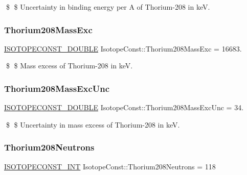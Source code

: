\$ \$ Uncertainty in binding energy per A of Thorium-\/208 in keV. \mbox{\label{group___isotope_const-_thorium-_th208_ga0853621c781ab985b66c22c74da66a8d}} 
\subsubsection{\texorpdfstring{Thorium208\+Mass\+Exc}{Thorium208MassExc}}
{\footnotesize\ttfamily \mbox{\hyperlink{group___isotope_const-_macros_ga8f45a7272ce02c0b4c65c44636ed719a}{I\+S\+O\+T\+O\+P\+E\+C\+O\+N\+S\+T\+\_\+\+D\+O\+U\+B\+LE}} Isotope\+Const\+::\+Thorium208\+Mass\+Exc = 16683.}

\$ \$ Mass excess of Thorium-\/208 in keV. \mbox{\label{group___isotope_const-_thorium-_th208_ga9d87941c94905c49cb9137367022edf7}} 
\subsubsection{\texorpdfstring{Thorium208\+Mass\+Exc\+Unc}{Thorium208MassExcUnc}}
{\footnotesize\ttfamily \mbox{\hyperlink{group___isotope_const-_macros_ga8f45a7272ce02c0b4c65c44636ed719a}{I\+S\+O\+T\+O\+P\+E\+C\+O\+N\+S\+T\+\_\+\+D\+O\+U\+B\+LE}} Isotope\+Const\+::\+Thorium208\+Mass\+Exc\+Unc = 34.}

\$ \$ Uncertainty in mass excess of Thorium-\/208 in keV. \mbox{\label{group___isotope_const-_thorium-_th208_ga2286a39d80cb58a1c0c2f5920de6ac18}} 
\subsubsection{\texorpdfstring{Thorium208\+Neutrons}{Thorium208Neutrons}}
{\footnotesize\ttfamily \mbox{\hyperlink{group___isotope_const-_macros_ga5f18360b3e99483a35c32d789e62621c}{I\+S\+O\+T\+O\+P\+E\+C\+O\+N\+S\+T\+\_\+\+I\+NT}} Isotope\+Const\+::\+Thorium208\+Neutrons = 118}

